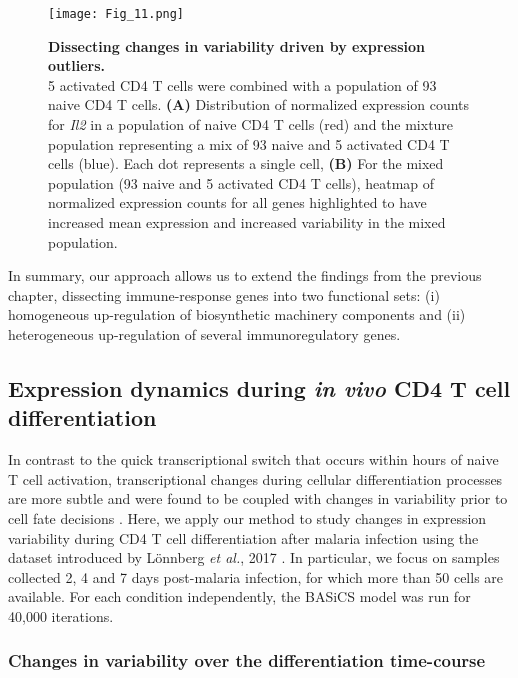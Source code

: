 \begin{figure}[!h]
\centering
\texttt{[image: Fig\_11.png]}
\caption[Dissecting changes in variability driven by expression outliers]{\textbf{Dissecting changes in variability driven by expression outliers.}\\
5 activated CD4\plus{} T cells were combined with a population of 93 naive CD4\plus{} T cells. \textbf{(A)} Distribution of normalized expression counts for \textit{Il2} in a population of naive CD4\plus{} T cells (red) and the mixture population representing a mix of 93 naive and 5 activated CD4\plus{} T cells (blue). Each dot represents a single cell, \textbf{(B)} For the mixed population (93 naive and 5 activated CD4\plus{} T cells), heatmap of normalized expression counts for all genes highlighted to have increased mean expression and increased variability in the mixed population.}
\label{fig2:mixture_population}
\end{figure}

In summary, our approach allows us to extend the findings from the previous chapter, dissecting immune-response genes into two functional sets: (i) homogeneous up-regulation of biosynthetic machinery components and (ii) heterogeneous up-regulation of several immunoregulatory genes.

\newpage

\subsection{Expression dynamics during \textit{in vivo} CD4\plus{} T cell differentiation}

In contrast to the quick transcriptional switch that occurs within hours of naive T cell activation, transcriptional changes during cellular differentiation processes are more subtle and were found to be coupled with changes in variability prior to cell fate decisions \citep{Richard2016, Mojtahedi2016}. Here, we apply our method to study changes in expression variability during CD4\plus{} T cell differentiation after malaria infection using the dataset introduced by L\"onnberg \emph{et al.}, 2017 \cite{Lonnberg2017}. In particular, we focus on samples collected 2, 4 and 7 days post-malaria infection, for which more than 50 cells are available. For each condition independently, the BASiCS model was run for 40,000 iterations.

\subsubsection{Changes in variability over the differentiation time-course}


